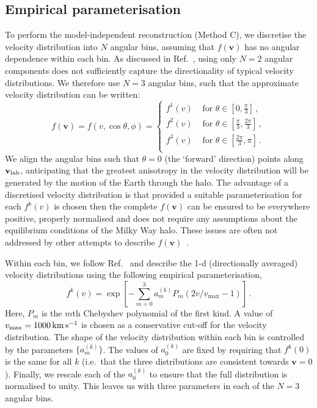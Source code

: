 \subsection{Empirical parameterisation}\label{sec:directional_parameterisation}
To perform the model-independent reconstruction (Method C), we discretise the velocity distribution into $N$ angular bins, assuming that $f(\mathbf{v})$ has no angular dependence within each bin. As discussed in Ref.~\cite{Kavanagh:2015aqa}, using only $N=2$ angular components does not sufficiently capture the directionality of typical velocity distributions. We therefore use $N=3$ angular bins, such that the approximate velocity distribution can be written:
\begin{equation}\label{eq:discretisedf}
f(\textbf{v}) = f(v, \cos\theta, \phi) =
\begin{cases}
f^1(v) & \textrm{ for } \theta \in \left[ 0, \frac{\pi}{3}\right]\,, \\
f^2(v) & \textrm{ for } \theta \in \left[ \frac{\pi}{3}, \frac{2\pi}{3}\right]\,, \\
f^3(v) & \textrm{ for } \theta \in \left[ \frac{2\pi}{3}, \pi\right]\,. \\
\end{cases}
\end{equation}
We align the angular bins such that $\theta = 0$ (the `forward' direction) points along $\mathbf{v}_{\rm lab}$, anticipating that the greatest anisotropy in the velocity distribution will be generated by the motion of the Earth through the halo. The advantage of a discretised velocity distribution is that provided a suitable parameterisation for each $f^k(v)$ is chosen then the complete $f(\textbf{v})$ can be ensured to be everywhere positive, properly normalised and does not require any assumptions about the equilibrium conditions of the Milky Way halo. These issues are often not addressed by other attempts to describe $f(\mathbf{v})$~\cite{Alves:2012ay,Lee:2014cpa}.

Within each bin, we follow Ref.~\cite{Kavanagh:2013wba} and describe the 1-d (directionally averaged) velocity distributions using the following empirical parameterisation,
\begin{equation}\label{eq:polynomialparam}
f^k(v) = \exp \left[ - \sum_{m = 0}^3 a_m^{(k)} P_m(2v/v_\mathrm{max} - 1)\right]\,.
\end{equation}
Here, $P_m$ is the $m$th Chebyshev polynomial of the first kind. A value of $v_\mathrm{max} = 1000 \,{\rm km\,s^{-1}}$ is chosen as a conservative cut-off for the velocity distribution. The shape of the velocity distribution within each bin is controlled by the parameters $\{a_m^{(k)}\}$. The values of $a_0^{(k)}$ are fixed by requiring that $f^k(0)$ is the same for all $k$ (i.e.~that the three distributions are consistent towards $\mathbf{v} = 0$). Finally, we rescale each of the $a_0^{(k)}$ to ensure that the full distribution is normalised to unity. This leaves us with three parameters in each of the $N=3$ angular bins.

